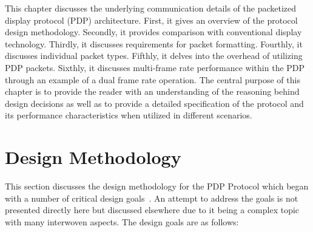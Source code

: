 \label{chap:pdp_protocol}

This chapter discusses the underlying communication details of the packetized display protocol (PDP) architecture. First, it gives an overview of the protocol design methodology. Secondly, it provides comparison with conventional display technology. Thirdly, it discusses requirements for packet formatting. Fourthly, it discusses individual packet types. Fifthly, it delves into the overhead of utilizing PDP packets. Sixthly, it discusses multi-frame rate performance within the PDP through an example of a dual frame rate operation. The central purpose of this chapter is to provide the reader with an understanding of the reasoning behind design decisions as well as to provide a detailed specification of the protocol and its performance characteristics when utilized in different scenarios.

\section{Design Methodology}
    \label{sec:design_methodology}
    This section discusses the design methodology for the PDP Protocol which began with a number of critical design goals~\cite{LandwehrEtAl2019}. An attempt to address the goals is not presented directly here but discussed  elsewhere due to it being a complex topic with many interwoven aspects. The design goals are as follows:

